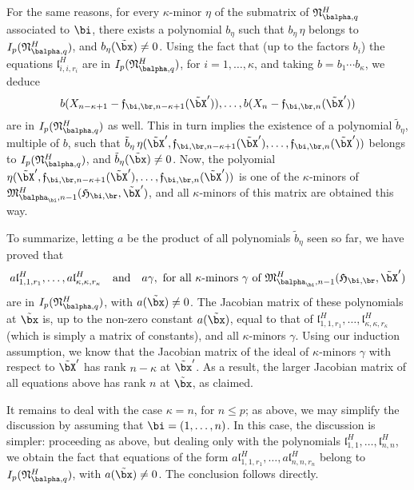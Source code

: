 \documentclass[12pt]{article}
\begin{document}
For the same reasons, for every $\kappa$-minor $\eta$ of the submatrix of
$\mathfrak{N}^H_{\balpha,q}$ associated to $\bi$, there exists a
polynomial $b_\eta$ such that $b_\eta\, \eta$ belongs to
$I_p(\mathfrak{N}^H_{\balpha,q})$, and $b_\eta(\tilde\bx)\ne 0$.  Using
the fact that (up to the factors $b_i$) the equations
$\mathfrak{l}^H_{i,i,r_i}$ are in $I_p(\mathfrak{N}^H_{\balpha,q})$, 
for $i=1,\dots,\kappa$, and taking $b=b_1 \cdots b_\kappa$, we
deduce 
$$
b(X_{n-\kappa+1}-\mathfrak{f}_{\bi,\br,n-\kappa+1}(\tilde\bX')),\dots,b(X_{n}-\mathfrak{f}_{\bi,\br,n}(\tilde\bX'))
$$ are in $I_p(\mathfrak{N}^H_{\balpha,q})$ as well. This in turn
implies the existence of a polynomial $\tilde b_\eta$, multiple of $b$, such that $\tilde
b_\eta\,
\eta(\tilde\bX',\mathfrak{f}_{\bi,\br,n-\kappa+1}(\tilde\bX'),\dots,\mathfrak{f}_{\bi,\br,n}(\tilde\bX'))$
belongs to $I_p(\mathfrak{N}^H_{\balpha,q})$, and $\tilde
b_\eta(\tilde\bx)\ne 0$. Now, the polyomial
$\eta(\tilde\bX',\mathfrak{f}_{\bi,\br,n-\kappa+1}(\tilde\bX'),\dots,\mathfrak{f}_{\bi,\br,n}(\tilde\bX'))$
is one of the $\kappa$-minors of
$\mathfrak{M}^H_{\balpha_\bi,n-1}(\mathfrak{H}_{\bi,\br},\tilde\bX')$,
and all $\kappa$-minors of this matrix are obtained this way.

To summarize, letting $a$ be the product of all polynomials $\tilde
b_\eta$ seen so far, we have proved that 
$$a \mathfrak{l}^H_{1,1,r_1},\dots,a
\mathfrak{l}^H_{\kappa,\kappa,r_\kappa} \quad\text{and}\quad a \gamma,
\text{~for all $\kappa$-minors $\gamma$ of
  $\mathfrak{M}^H_{\balpha_\bi,n-1}(\mathfrak{H}_{\bi,\br},\tilde\bX')$}$$
are in $I_p(\mathfrak{N}^H_{\balpha,q})$, with $a(\tilde\bx) \ne
0$. The Jacobian matrix of these polynomials at $\tilde\bx$ is, up to
the non-zero constant $a(\tilde\bx)$, equal to that of
$\mathfrak{l}^H_{1,1,r_1},\dots,
\mathfrak{l}^H_{\kappa,\kappa,r_\kappa}$ (which is simply 
a matrix of constants), and all $\kappa$-minors
$\gamma$. Using our induction assumption, we know that the Jacobian
matrix of the ideal of $\kappa$-minors $\gamma$ with respect to
$\tilde\bX'$ has rank $n-\kappa$ at $\tilde\bx'$. As a result, 
the larger Jacobian matrix of all equations above 
has rank $n$ at $\tilde\bx$, as claimed.

It remains to deal with the case $\kappa=n$, for $n \le p$; as above,
we may simplify the discussion by assuming that $\bi=(1,\dots,n)$. In
this case, the discussion is simpler: proceeding as above, but dealing
only with the polynomials
$\mathfrak{l}^H_{1,1},\dots,\mathfrak{l}^H_{n,n}$, we obtain the fact
that equations of the form $a \mathfrak{l}^H_{1,1,r_1},\dots,a
\mathfrak{l}^H_{n,n,r_n}$ belong to $I_p(\mathfrak{N}^H_{\balpha,q})$,
with $a(\tilde\bx) \ne 0$. The conclusion follows directly.
\end{document}
